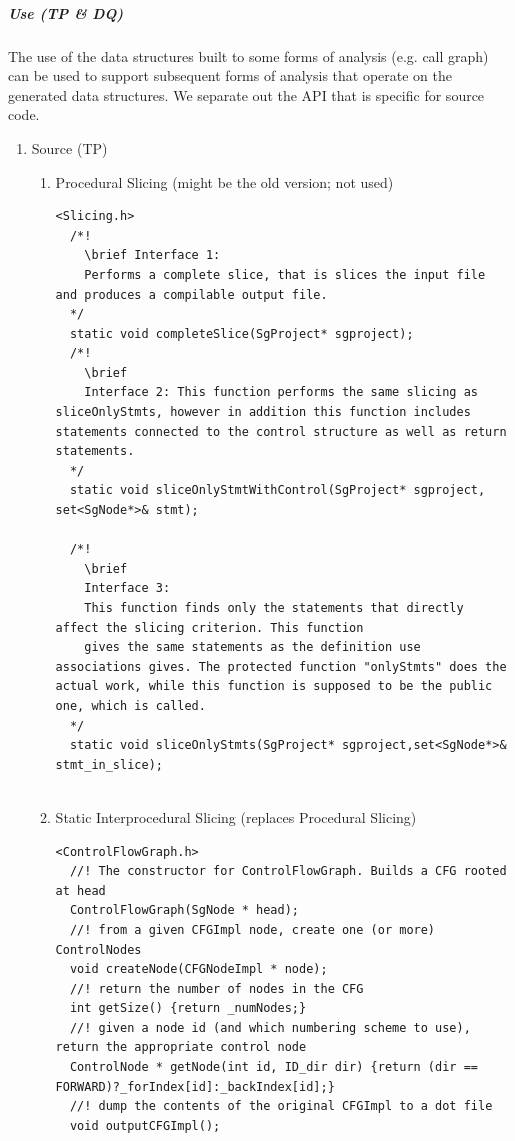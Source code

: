 \subparagraph{Use (TP \& DQ)}
   The use of the data structures built to some forms of analysis (e.g. call graph)
can be used to support subsequent forms of analysis that operate on the generated
data structures. We separate out the API that is specific for source code.
\begin{enumerate}
   \item Source (TP) \\
   \begin{enumerate}

      \item Procedural Slicing (might be the old version; not used) 
      \begin{lstlisting}
<Slicing.h>
  /*!
    \brief Interface 1:
    Performs a complete slice, that is slices the input file and produces a compilable output file. 
  */
  static void completeSlice(SgProject* sgproject);
  /*! 
    \brief
    Interface 2: This function performs the same slicing as sliceOnlyStmts, however in addition this function includes statements connected to the control structure as well as return statements.
  */
  static void sliceOnlyStmtWithControl(SgProject* sgproject, set<SgNode*>& stmt);

  /*! 
    \brief
    Interface 3:
    This function finds only the statements that directly affect the slicing criterion. This function
    gives the same statements as the definition use associations gives. The protected function "onlyStmts" does the actual work, while this function is supposed to be the public one, which is called.
  */
  static void sliceOnlyStmts(SgProject* sgproject,set<SgNode*>&  stmt_in_slice);


      \end{lstlisting}


      \item Static Interprocedural Slicing (replaces Procedural Slicing)
      \begin{lstlisting}
<ControlFlowGraph.h>
  //! The constructor for ControlFlowGraph. Builds a CFG rooted at head
  ControlFlowGraph(SgNode * head);
  //! from a given CFGImpl node, create one (or more) ControlNodes
  void createNode(CFGNodeImpl * node);
  //! return the number of nodes in the CFG
  int getSize() {return _numNodes;}
  //! given a node id (and which numbering scheme to use), return the appropriate control node
  ControlNode * getNode(int id, ID_dir dir) {return (dir == FORWARD)?_forIndex[id]:_backIndex[id];}
  //! dump the contents of the original CFGImpl to a dot file
  void outputCFGImpl();


\end{lstlisting}
\end{enumerate}
\end{enumerate}
